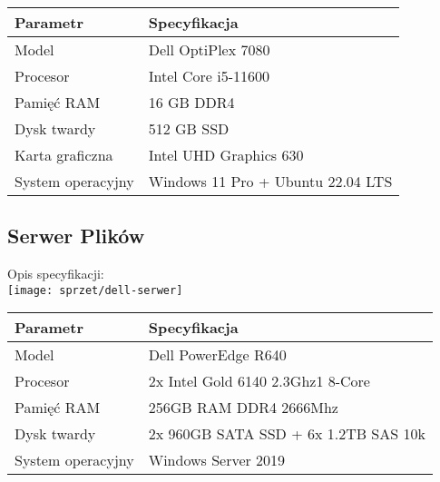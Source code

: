     \begin{flushleft}
        \begin{table}[h]
            \renewcommand{\arraystretch}{1.5}
            \begin{tabular}{|l|l|}
            \hline
                \textbf{Parametr} & \textbf{Specyfikacja} \\
            \hline
                Model & Dell OptiPlex 7080 \\
                Procesor & Intel Core i5-11600 \\
                Pamięć RAM & 16 GB DDR4 \\
                Dysk twardy & 512 GB SSD \\
                Karta graficzna & Intel UHD Graphics 630 \\
                System operacyjny & Windows 11 Pro + Ubuntu 22.04 LTS \\
            \hline
            \end{tabular}
        \end{table}  
    \end{flushleft}
\pagebreak

\subsection{Serwer Plików}

    Opis specyfikacji:\\
    \texttt{[image: sprzet/dell-serwer]}

    \begin{flushleft}
        \begin{table}[h]
            \renewcommand{\arraystretch}{1.5}
            \begin{tabular}{|l|l|}
            \hline
                \textbf{Parametr} & \textbf{Specyfikacja} \\
            \hline
                Model & Dell PowerEdge R640 \\
                Procesor & 2x Intel Gold 6140 2.3Ghz1 8-Core \\
                Pamięć RAM & 256GB RAM DDR4 2666Mhz \\
                Dysk twardy & 2x 960GB SATA SSD + 6x 1.2TB SAS 10k \\
                System operacyjny & Windows Server 2019 \\
            \hline
            \end{tabular}
        \end{table}  
    \end{flushleft}

